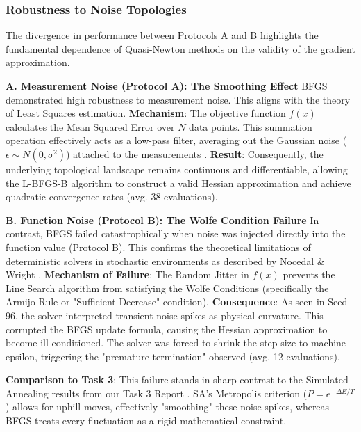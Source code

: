 \subsubsection{Robustness to Noise Topologies}
The divergence in performance between Protocols A and B highlights the fundamental dependence of Quasi-Newton methods on the validity of the gradient approximation.

\textbf{A. Measurement Noise (Protocol A): The Smoothing Effect}
BFGS demonstrated high robustness to measurement noise. This aligns with the theory of Least Squares estimation.
\textbf{Mechanism}: The objective function $f(x)$ calculates the Mean Squared Error over $N$ data points. This summation operation effectively acts as a low-pass filter, averaging out the Gaussian noise ($\epsilon \sim N(0, \sigma^2)$) attached to the measurements \cite{bishop2006}.
\textbf{Result}: Consequently, the underlying topological landscape remains continuous and differentiable, allowing the L-BFGS-B algorithm to construct a valid Hessian approximation and achieve quadratic convergence rates (avg. 38 evaluations).

\textbf{B. Function Noise (Protocol B): The Wolfe Condition Failure}
In contrast, BFGS failed catastrophically when noise was injected directly into the function value (Protocol B). This confirms the theoretical limitations of deterministic solvers in stochastic environments as described by Nocedal \& Wright \cite{nocedalwright2006}.
\textbf{Mechanism of Failure}: The Random Jitter in $f(x)$ prevents the Line Search algorithm from satisfying the Wolfe Conditions (specifically the Armijo Rule or "Sufficient Decrease" condition).
\textbf{Consequence}: As seen in Seed 96, the solver interpreted transient noise spikes as physical curvature. This corrupted the BFGS update formula, causing the Hessian approximation to become ill-conditioned. The solver was forced to shrink the step size to machine epsilon, triggering the "premature termination" observed (avg. 12 evaluations).

\textbf{Comparison to Task 3}: This failure stands in sharp contrast to the Simulated Annealing results from our Task 3 Report \cite{task3report}. SA’s Metropolis criterion ($P = e^{-\Delta E / T}$) allows for uphill moves, effectively "smoothing" these noise spikes, whereas BFGS treats every fluctuation as a rigid mathematical constraint.

